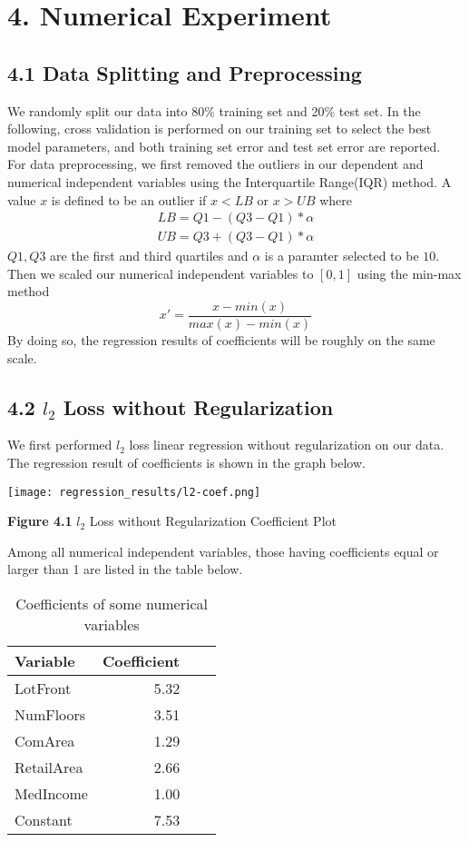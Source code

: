 \documentclass[9pt,twocolumn,twoside]{pnas-new}
\begin{document}
\section*{4. Numerical Experiment}
\subsection*{4.1 Data Splitting and Preprocessing}
We randomly split our data into 80\% training set and 20\% test set. In the following, cross validation is performed on our training set to select the best model parameters, and both training set error and test set error are reported.\\
\linebreak
\noindent For data preprocessing, we first removed the outliers in our dependent and numerical independent variables using the  Interquartile Range(IQR) method. A value $x$  is defined to be an outlier if $x<LB$ or $x>UB$ where
\begin{align*}
LB = Q1 - (Q3-Q1)*\alpha\\
UB = Q3 + (Q3-Q1)*\alpha
\end{align*}
$Q1,Q3$ are the first and third quartiles and $\alpha$
 is a paramter selected to be $10$. Then we scaled our numerical independent variables to $[0,1]$ using the min-max method
\begin{equation*}
x' = \frac{x-min(x)}{max(x)-min(x)}
\end{equation*}
By doing so, the regression results of coefficients will be roughly on the same scale.\\

\subsection*{4.2 $l_{2}$ Loss without Regularization}
We first performed $l_{2}$ loss linear regression without regularization on our data. 
The regression result of coefficients is shown in the graph below.

\texttt{[image: regression\_results/l2-coef.png]}
\begin{center}
\textbf{Figure 4.1} $l_{2}$ Loss without Regularization Coefficient Plot
\end{center}

\noindent Among  all numerical independent variables, those having coefficients equal or larger than 1 are listed in the table below.
\begin{table}[H]
\begin{tabular}{lrrr}
Variable & Coefficient\\
\midrule
LotFront & 5.32 \\
NumFloors & 3.51 \\
ComArea & 1.29\\
RetailArea & 2.66 \\
MedIncome & 1.00 \\
Constant & 7.53\\
\bottomrule
\end{tabular}
\centering
\caption{Coefficients of some numerical variables}
\end{table}
\end{document}
